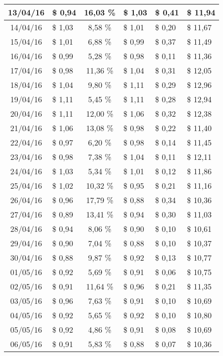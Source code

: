 \begin{center}
\begin{small}
\begin{longtable}{|c|l|c|l|l|l|}
13/04/16 & \$ 0,94 & 16,03 \% & \$ 1,03 & \$ 0,41 & \$ 11,94 \\ \hline
14/04/16 & \$ 1,03 & 8,58 \% & \$ 1,01 & \$ 0,20 & \$ 11,67 \\ \hline
15/04/16 & \$ 1,01 & 6,88 \% & \$ 0,99 & \$ 0,37 & \$ 11,49 \\ \hline
16/04/16 & \$ 0,99 & 5,28 \% & \$ 0,98 & \$ 0,11 & \$ 11,36 \\ \hline
17/04/16 & \$ 0,98 & 11,36 \% & \$ 1,04 & \$ 0,31 & \$ 12,05 \\ \hline
18/04/16 & \$ 1,04 & 9,80 \% & \$ 1,11 & \$ 0,29 & \$ 12,96 \\ \hline
19/04/16 & \$ 1,11 & 5,45 \% & \$ 1,11 & \$ 0,28 & \$ 12,94 \\ \hline
20/04/16 & \$ 1,11 & 12,00 \% & \$ 1,06 & \$ 0,32 & \$ 12,38 \\ \hline
21/04/16 & \$ 1,06 & 13,08 \% & \$ 0,98 & \$ 0,22 & \$ 11,40 \\ \hline
22/04/16 & \$ 0,97 & 6,20 \% & \$ 0,98 & \$ 0,14 & \$ 11,45 \\ \hline
23/04/16 & \$ 0,98 & 7,38 \% & \$ 1,04 & \$ 0,11 & \$ 12,11 \\ \hline
24/04/16 & \$ 1,03 & 5,34 \% & \$ 1,01 & \$ 0,12 & \$ 11,86 \\ \hline
25/04/16 & \$ 1,02 & 10,32 \% & \$ 0,95 & \$ 0,21 & \$ 11,16 \\ \hline
26/04/16 & \$ 0,96 & 17,79 \% & \$ 0,88 & \$ 0,34 & \$ 10,36 \\ \hline
27/04/16 & \$ 0,89 & 13,41 \% & \$ 0,94 & \$ 0,30 & \$ 11,03 \\ \hline
28/04/16 & \$ 0,94 & 8,06 \% & \$ 0,90 & \$ 0,10 & \$ 10,61 \\ \hline
29/04/16 & \$ 0,90 & 7,04 \% & \$ 0,88 & \$ 0,10 & \$ 10,37 \\ \hline
30/04/16 & \$ 0,88 & 9,87 \% & \$ 0,92 & \$ 0,13 & \$ 10,77 \\ \hline
01/05/16 & \$ 0,92 & 5,69 \% & \$ 0,91 & \$ 0,06 & \$ 10,75 \\ \hline
02/05/16 & \$ 0,91 & 11,64 \% & \$ 0,96 & \$ 0,21 & \$ 11,35 \\ \hline
03/05/16 & \$ 0,96 & 7,63 \% & \$ 0,91 & \$ 0,10 & \$ 10,69 \\ \hline
04/05/16 & \$ 0,92 & 5,65 \% & \$ 0,92 & \$ 0,10 & \$ 10,80 \\ \hline
05/05/16 & \$ 0,92 & 4,86 \% & \$ 0,91 & \$ 0,08 & \$ 10,69 \\ \hline
06/05/16 & \$ 0,91 & 5,83 \% & \$ 0,88 & \$ 0,07 & \$ 10,36 \\ \hline

\end{longtable}
\end{small}
\end{center}
